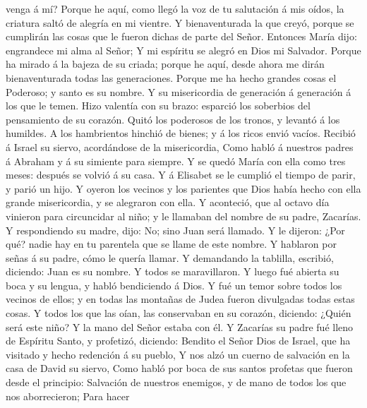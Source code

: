 venga á mí?  Porque he aquí, como llegó la voz de tu
salutación á mis oídos, la criatura saltó de alegría en mi vientre.
 Y bienaventurada la que creyó, porque se cumplirán las
cosas que le fueron dichas de parte del Señor.  Entonces
María dijo: engrandece mi alma al Señor;  Y mi espíritu se
alegró en Dios mi Salvador.  Porque ha mirado á la bajeza
de su criada; porque he aquí, desde ahora me dirán bienaventurada todas
las generaciones.  Porque me ha hecho grandes cosas el
Poderoso; y santo es su nombre.  Y su misericordia de
generación á generación á los que le temen.  Hizo valentía
con su brazo: esparció los soberbios del pensamiento de su corazón.
 Quitó los poderosos de los tronos, y levantó á los
humildes.  A los hambrientos hinchió de bienes; y á los
ricos envió vacíos.  Recibió á Israel su siervo,
acordándose de la misericordia,  Como habló á nuestros
padres á Abraham y á su simiente para siempre.  Y se quedó
María con ella como tres meses: después se volvió á su casa.
 Y á Elisabet se le cumplió el tiempo de parir, y parió un
hijo.  Y oyeron los vecinos y los parientes que Dios había
hecho con ella grande misericordia, y se alegraron con ella.
 Y aconteció, que al octavo día vinieron para circuncidar
al niño; y le llamaban del nombre de su padre, Zacarías.  Y
respondiendo su madre, dijo: No; sino Juan será llamado.  Y
le dijeron: ¿Por qué? nadie hay en tu parentela que se llame de este
nombre.  Y hablaron por señas á su padre, cómo le quería
llamar.  Y demandando la tablilla, escribió, diciendo: Juan
es su nombre. Y todos se maravillaron.  Y luego fué abierta
su boca y su lengua, y habló bendiciendo á Dios.  Y fué un
temor sobre todos los vecinos de ellos; y en todas las montañas de Judea
fueron divulgadas todas estas cosas.  Y todos los que las
oían, las conservaban en su corazón, diciendo: ¿Quién será este niño? Y
la mano del Señor estaba con él.  Y Zacarías su padre fué
lleno de Espíritu Santo, y profetizó, diciendo:  Bendito el
Señor Dios de Israel, que ha visitado y hecho redención á su pueblo,
 Y nos alzó un cuerno de salvación en la casa de David su
siervo,  Como habló por boca de sus santos profetas que
fueron desde el principio:  Salvación de nuestros enemigos,
y de mano de todos los que nos aborrecieron;  Para hacer
